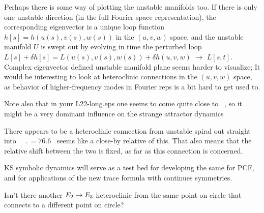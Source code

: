 \bigskip

Perhaps there is some way of plotting the unstable manifolds too. If
there is only one unstable direction (in the full Fourier space
representation), the corresponding eigenvector is a unique loop function
$h[s] =  h(u(s),v(s),w(s))$ in the $(u,v,w)$ space, and the unstable manifold
$U$ is swept out by evolving in time the perturbed loop
$L[s] + \delta h[s] =  L(u(s),v(s),w(s)) + \delta h(u,v,w)$
$\to$ $L[s,t]$.
Complex eigenvector defined unstable manifold plane seems
harder to visualize;  It would be interesting
to look at heteroclinic connections in the $(u,v,w)$ space, as
behavior of higher-frequency modes in Fourier reps is a bit
hard to get used to.

\bigskip

Note also that in your L22-long.eps one seems
to come quite close to ~\eqv, so it might be a very dominant
influence on the strange attractor dynamics


There appears to be a heteroclinic connection from 
{\eqv}
unstable spiral out straight into ~{\eqv}
$\period{} = 76.6$ \rpo\ seems like a close-by
relative of this.
That also means that the relative shift between the two {\eqva} is
fixed, as far as this connection is concerned.

KS symbolic dynamics will
serve as a test bed for developing the
same for PCF, and for applications of the new
trace formula with continues symmetries.

%
Isn't there another $ E_{2} \to E_{3} $ heteroclinic
from the same point on   circle that connects to a different point on
 circle?


\bigskip



